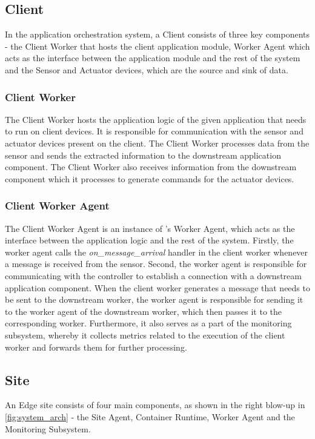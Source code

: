 \subsection{Client}
In the \oneedge{} application orchestration system, a Client consists of three key components - the Client Worker that hosts the client application module, Worker Agent which acts as the interface between the application module and the rest of the system and the Sensor and Actuator devices, which are the source and sink of data.

\subsubsection{Client Worker}
The Client Worker hosts the application logic of the given application that needs to run on client devices. It is responsible for communication with the sensor and actuator devices present on the client. The Client Worker processes data from the sensor and sends the extracted information to the downstream application component. The Client Worker also receives information from the downstream component which it processes to generate commands for the actuator devices.

\subsubsection{Client Worker Agent}
The Client Worker Agent is an instance of \oneedge's Worker Agent, which acts as the interface between the application logic and the rest of the system. Firstly, the worker agent calls the \textit{on\_message\_arrival} handler in the client worker whenever a message is received from the sensor. Second, the worker agent is responsible for communicating with the controller to establish a connection with a downstream application component. When the client worker generates a message that needs to be sent to the downstream worker, the worker agent is responsible for sending it to the worker agent of the downstream worker, which then passes it to the corresponding worker. Furthermore, it also serves as a part of the monitoring subsystem, whereby it collects metrics related to the execution of the client worker and forwards them for further processing.

\subsection{Site}
An Edge site consists of four main components, as shown in the right blow-up in \cref{fig:system_arch} - the Site Agent, Container Runtime, Worker Agent and the Monitoring Subsystem. 
